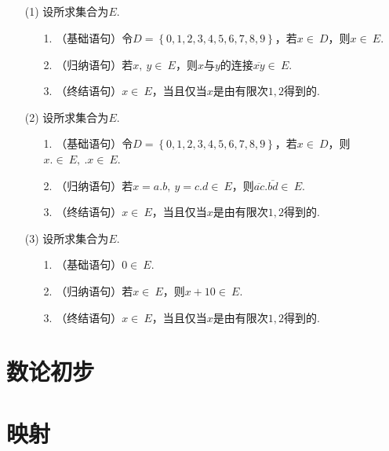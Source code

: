 \documentclass[UTF8]{ctexart}
\begin{document}
\subsection{}   %
\begin{enumerate}
    \item [(1)]设所求集合为$E$.
    \begin{enumerate}
        \item [1.]（基础语句）令$D=\left\{0,1,2,3,4,5,6,7,8,9\right\}$，若$x\in\ D$，则$x\in\ E$.
        \item [2.]（归纳语句）若$x,\ y\in\ E$，则$x$与$y$的连接$\overline{xy}\in\ E$.
        \item [3.]（终结语句）$x\in \ E$，当且仅当$x$是由有限次$1,2$得到的.
    \end{enumerate}

    \item [(2)]设所求集合为$E$.
    \begin{enumerate}
        \item [1.]（基础语句）令$D=\left\{0,1,2,3,4,5,6,7,8,9\right\}$，若$x\in\ D$，则$x.\in\ E,\ .x\in\ E$.
        \item [2.]（归纳语句）若$x=a.b,\ y=c.d\in\ E$，则$\overline{ac} . \overline{bd}\in\ E$.
        \item [3.]（终结语句）$x\in \ E$，当且仅当$x$是由有限次$1,2$得到的.
    \end{enumerate}

    \item [(3)]设所求集合为$E$.
    \begin{enumerate}
        \item [1.]（基础语句）$0\in\ E$.
        \item [2.]（归纳语句）若$x\in\ E$，则$x+10\in \ E$.
        \item [3.]（终结语句）$x\in \ E$，当且仅当$x$是由有限次$1,2$得到的.
    \end{enumerate}
\end{enumerate}

\newpage

\section{数论初步}

\newpage

\section{映射}
\end{document}
